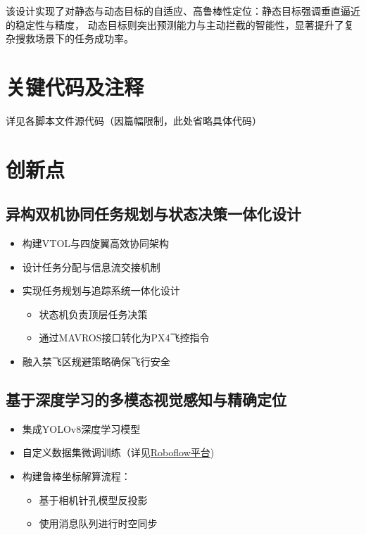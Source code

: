 \documentclass[12pt]{article}
\begin{document}
该设计实现了对静态与动态目标的自适应、高鲁棒性定位：静态目标强调垂直逼近的稳定性与精度，
动态目标则突出预测能力与主动拦截的智能性，显著提升了复杂搜救场景下的任务成功率。

\section{关键代码及注释}

详见各脚本文件源代码（因篇幅限制，此处省略具体代码）

\section{创新点}
\subsection{异构双机协同任务规划与状态决策一体化设计}
\begin{itemize}
    \item 构建VTOL与四旋翼高效协同架构
    \item 设计任务分配与信息流交接机制
    \item 实现任务规划与追踪系统一体化设计
    \begin{itemize}
        \item 状态机负责顶层任务决策
        \item 通过MAVROS接口转化为PX4飞控指令
    \end{itemize}
    \item 融入禁飞区规避策略确保飞行安全
\end{itemize}

\subsection{基于深度学习的多模态视觉感知与精确定位}
\begin{itemize}
    \item 集成YOLOv8深度学习模型
    \item 自定义数据集微调训练（详见\href{https://app.roboflow.com/join/eyJhbGciOiJIUzI1NiIsInR5cCI6IkpXVCJ9.eyJ3b3Jrc3BhY2VJZCI6IlQ4VGZpZ0FqQkdOMWIzT1pITjNNMUJ3dDNoazIiLCJyb2xlIjoib3duZXIiLCJpbnZpdGVyIjoiaGFpa2U4MjZAZ21haWwuY29tIiwiaWF0IjoxNzUzNjc5NTUzfQ.ksRN2pjtnuXkUIybOxv0PoRmLFUzQssGo_Zjj3tStE0}{Roboflow平台})
    \item 构建鲁棒坐标解算流程：
    \begin{itemize}
        \item 基于相机针孔模型反投影
        \item 使用消息队列进行时空同步
    \end{itemize}
\end{itemize}
\end{document}
